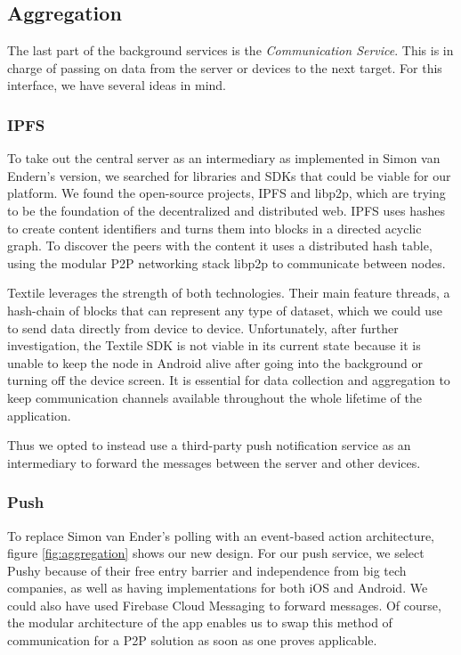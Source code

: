 \subsection{Aggregation}
The last part of the background services is the \textit{Communication Service}. This is in charge of passing on data from the server or devices to the next target. For this interface, we have several ideas in mind.
 
\subsubsection{IPFS}
To take out the central server as an intermediary as implemented in Simon van Endern's version, we searched for libraries and SDKs that could be viable for our platform. We found the open-source projects, IPFS and libp2p, which are trying to be the foundation of the decentralized and distributed web. IPFS uses hashes to create content identifiers and turns them into blocks in a directed acyclic graph. To discover the peers with the content it uses a distributed hash table, using the modular P2P networking stack libp2p to communicate between nodes.

Textile leverages the strength of both technologies. Their main feature threads, a hash-chain of blocks that can represent any type of dataset, which we could use to send data directly from device to device. Unfortunately, after further investigation, the Textile SDK is not viable in its current state because it is unable to keep the node in Android alive after going into the background or turning off the device screen. It is essential for data collection and aggregation to keep communication channels available throughout the whole lifetime of the application.

Thus we opted to instead use a third-party push notification service as an intermediary to forward the messages between the server and other devices.

\subsubsection{Push}
To replace Simon van Ender's polling with an event-based action architecture, figure \ref{fig:aggregation} shows our new design. For our push service, we select Pushy
because of their free entry barrier and independence from big tech companies, as well as having implementations for both iOS and Android. We could also have used Firebase Cloud Messaging to forward messages. Of course, the modular architecture of the app enables us to swap this method of communication for a P2P solution as soon as one proves applicable.

